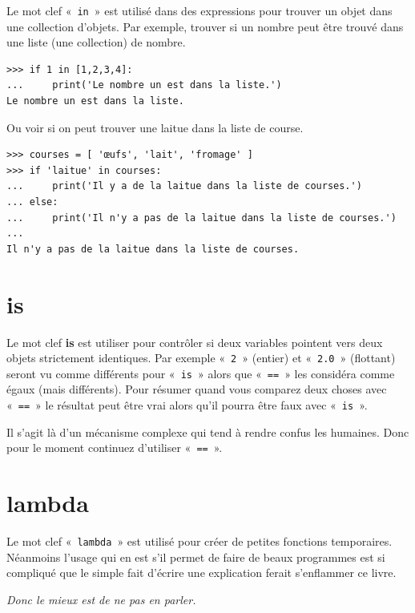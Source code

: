 Le mot clef « \texttt{in} » est utilisé dans des expressions pour trouver un objet dans une collection d'objets. Par exemple, trouver si un nombre peut être trouvé dans une liste (une collection) de nombre.

\begin{Verbatim}[frame=single,rulecolor=\color{gray}]
>>> if 1 in [1,2,3,4]:
...     print('Le nombre un est dans la liste.')
Le nombre un est dans la liste.
\end{Verbatim}

Ou voir si on peut trouver une laitue dans la liste de course.

\begin{Verbatim}[frame=single,rulecolor=\color{gray}]
>>> courses = [ 'œufs', 'lait', 'fromage' ]
>>> if 'laitue' in courses:
...     print('Il y a de la laitue dans la liste de courses.')
... else:
...     print('Il n'y a pas de la laitue dans la liste de courses.')
...
Il n'y a pas de la laitue dans la liste de courses.
\end{Verbatim}

\section*{is}

Le mot clef \textbf{is} est utiliser pour contrôler si deux variables pointent vers deux objets strictement identiques. Par exemple « \texttt{2} » (entier) et « \texttt{2.0} » (flottant) seront vu comme différents pour « \texttt{is} » alors que « \texttt{==} » les considéra comme égaux (mais différents). Pour résumer quand vous comparez deux choses avec « \texttt{==} » le résultat peut être vrai alors qu'il pourra être faux avec  « \texttt{is} ».

Il s'agit là d'un mécanisme complexe qui tend à rendre confus les humaines. Donc pour le moment continuez d'utiliser « \texttt{==} ».

\section*{lambda}

Le mot clef « \texttt{lambda} » est utilisé pour créer de petites fonctions temporaires. Néanmoins l'usage qui en est s'il permet de faire de beaux programmes est si compliqué que le simple fait d'écrire une explication ferait s'enflammer ce livre.

\emph{Donc le mieux est de ne pas en parler.}


